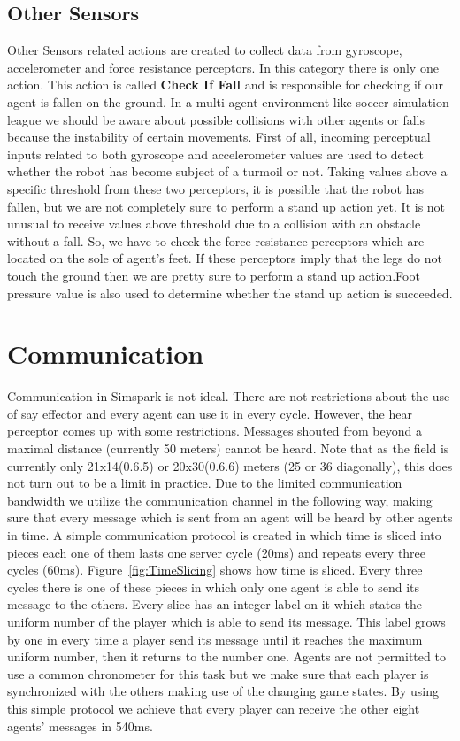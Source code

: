 \subsection{Other Sensors}

Other Sensors related actions are created to collect data from gyroscope, accelerometer and force resistance perceptors. In this category there is only one action. This action is called {\bf Check If Fall} and is responsible for checking if our agent is fallen on the ground. In a multi-agent environment like soccer simulation league we should be aware about possible collisions with other agents or falls because the instability of certain movements. First of all, incoming perceptual inputs related to both gyroscope and accelerometer values are used to detect whether the robot has become subject of a turmoil or not. Taking values above a specific threshold from these two perceptors, it is possible that the robot has fallen, but we are not completely sure to perform a stand up action yet. It is not unusual to receive values above threshold due to a collision with an obstacle without a fall. So, we have to check the force resistance perceptors which are located on the sole of agent's feet. If these perceptors imply that the legs do not touch the ground then we are pretty sure to perform a stand up action.Foot pressure value is also used to determine whether the stand up action is succeeded.


\section{Communication}
Communication in Simspark is not ideal. There are not restrictions about the use of say effector and every agent can use it in every cycle. However, the hear perceptor comes up with some restrictions. Messages shouted from beyond a maximal distance (currently 50 meters) cannot be heard. Note that as the field is currently only 21x14(0.6.5) or 20x30(0.6.6) meters (25 or 36 diagonally), this does not turn out to be a limit in practice. Due to the limited communication bandwidth we utilize the communication channel in the following way, making sure that every message which is sent from an agent will be heard by other agents in time. A simple communication protocol is created in which time is sliced into pieces each one of them lasts one server cycle (20ms) and repeats every three cycles (60ms). Figure~\ref{fig:TimeSlicing} shows how time is sliced. Every three cycles there is one of these pieces in which only one agent is able to send its message to the others. Every slice has an integer label on it which states the uniform number of the player which is able to send its message. This label grows by one in every time a player send its message until it reaches the maximum uniform number, then it returns to the number one. Agents are not permitted to use a common chronometer for this task but we make sure that each player is synchronized with the others making use of the changing game states. By using this simple protocol we achieve that every player can receive the other eight agents' messages in 540ms.

